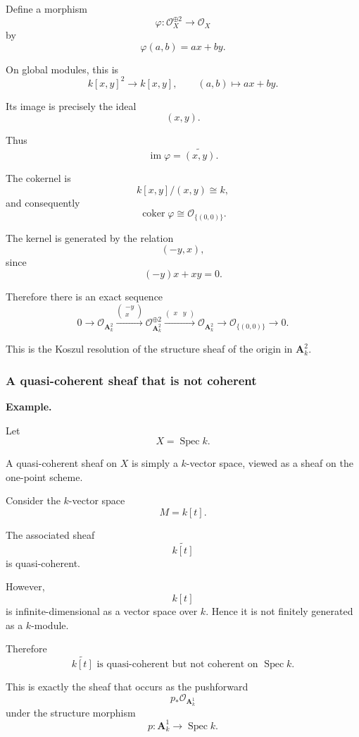 Define a morphism
\[
\varphi:\mathcal O_X^{\oplus 2}\longrightarrow\mathcal O_X
\]
by
\[
\varphi(a,b)=ax+by.
\]

On global modules, this is
\[
k[x,y]^2\longrightarrow k[x,y],
\qquad
(a,b)\longmapsto ax+by.
\]

Its image is precisely the ideal
\[
(x,y).
\]

Thus
\[
\operatorname{im}\varphi=\widetilde{(x,y)}.
\]

The cokernel is
\[
k[x,y]/(x,y)\cong k,
\]
and consequently
\[
\operatorname{coker}\varphi
\cong
\mathcal O_{\{(0,0)\}}.
\]

The kernel is generated by the relation
\[
(-y,x),
\]
since
\[
(-y)x+xy=0.
\]

Therefore there is an exact sequence
\[
0
\longrightarrow
\mathcal O_{\mathbf A^2_k}
\xrightarrow{
	\begin{pmatrix}
		-y\\
		x
	\end{pmatrix}
}
\mathcal O_{\mathbf A^2_k}^{\oplus 2}
\xrightarrow{
	\begin{pmatrix}
		x & y
	\end{pmatrix}
}
\mathcal O_{\mathbf A^2_k}
\longrightarrow
\mathcal O_{\{(0,0)\}}
\longrightarrow
0.
\]

This is the Koszul resolution of the structure sheaf of the origin in \(\mathbf A^2_k\).

\subsubsection{A quasi-coherent sheaf that is not coherent}

\textbf{Example.}

Let
\[
X=\operatorname{Spec}k.
\]

A quasi-coherent sheaf on \(X\) is simply a \(k\)-vector space, viewed as a sheaf on the one-point scheme.

Consider the \(k\)-vector space
\[
M=k[t].
\]

The associated sheaf
\[
\widetilde{k[t]}
\]
is quasi-coherent.

However,
\[
k[t]
\]
is infinite-dimensional as a vector space over \(k\). Hence it is not finitely generated as a \(k\)-module.

Therefore
\[
\boxed{
	\widetilde{k[t]}
	\text{ is quasi-coherent but not coherent on }\operatorname{Spec}k.
}
\]

This is exactly the sheaf that occurs as the pushforward
\[
p_*\mathcal O_{\mathbf A^1_k}
\]
under the structure morphism
\[
p:\mathbf A^1_k\longrightarrow\operatorname{Spec}k.
\]

